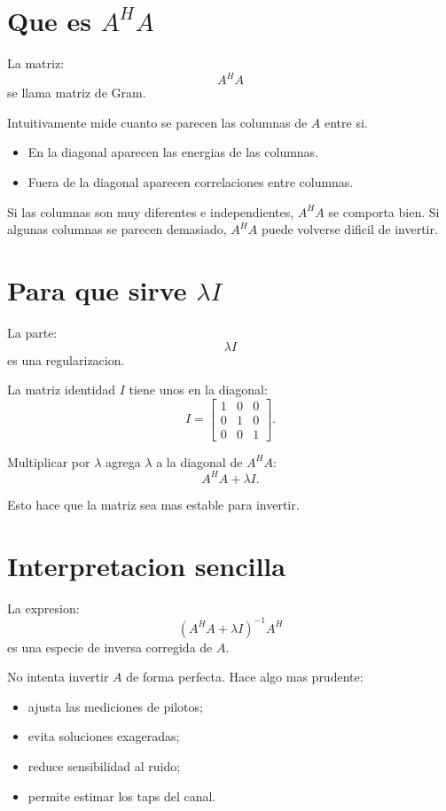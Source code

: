 \documentclass[11pt]{article}
\begin{document}
\section{Que es \(A^H A\)}

La matriz:
\[
    A^H A
\]
se llama matriz de Gram.

Intuitivamente mide cuanto se parecen las columnas de \(A\) entre si.

\begin{itemize}
    \item En la diagonal aparecen las energias de las columnas.
    \item Fuera de la diagonal aparecen correlaciones entre columnas.
\end{itemize}

Si las columnas son muy diferentes e independientes, \(A^H A\) se comporta
bien. Si algunas columnas se parecen demasiado, \(A^H A\) puede volverse dificil
de invertir.

\section{Para que sirve \(\lambda I\)}

La parte:
\[
    \lambda I
\]
es una regularizacion.

La matriz identidad \(I\) tiene unos en la diagonal:
\[
    I =
    \begin{bmatrix}
        1 & 0 & 0\\
        0 & 1 & 0\\
        0 & 0 & 1
    \end{bmatrix}.
\]

Multiplicar por \(\lambda\) agrega \(\lambda\) a la diagonal de \(A^H A\):
\[
    A^H A + \lambda I.
\]

Esto hace que la matriz sea mas estable para invertir.

\section{Interpretacion sencilla}

La expresion:
\[
    (A^H A + \lambda I)^{-1}A^H
\]
es una especie de inversa corregida de \(A\).

No intenta invertir \(A\) de forma perfecta. Hace algo mas prudente:

\begin{itemize}
    \item ajusta las mediciones de pilotos;
    \item evita soluciones exageradas;
    \item reduce sensibilidad al ruido;
    \item permite estimar los taps del canal.
\end{itemize}
\end{document}
